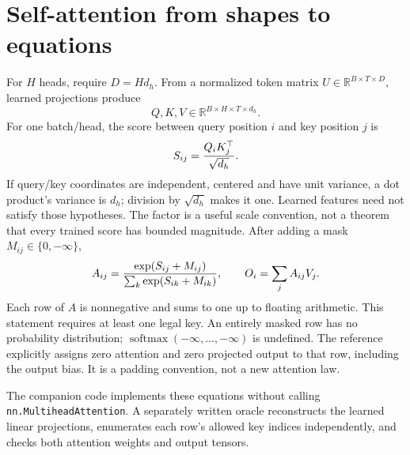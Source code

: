 \section{Self-attention from shapes to equations}

For $H$ heads, require $D=Hd_h$. From a normalized token matrix
$U\in\mathbb R^{B\times T\times D}$, learned projections produce
\[
Q,K,V\in\mathbb R^{B\times H\times T\times d_h}.
\]
For one batch/head, the score between query position $i$ and key position $j$ is
\begin{equation}
S_{ij}={Q_iK_j^\top\over\sqrt{d_h}}.
\label{evod23:score}
\end{equation}
If query/key coordinates are independent, centered and have unit variance, a dot
product's variance is $d_h$; division by $\sqrt{d_h}$ makes it one. Learned features
need not satisfy those hypotheses. The factor is a useful scale convention, not
a theorem that every trained score has bounded magnitude.
After adding a mask $M_{ij}\in\{0,-\infty\}$,
\[
A_{ij}={\exp(S_{ij}+M_{ij})\over\sum_k\exp(S_{ik}+M_{ik})},
\qquad O_i=\sum_jA_{ij}V_j.
\]
Each row of $A$ is nonnegative and sums to one up to floating arithmetic.
This statement requires at least one legal key. An entirely masked row has no
probability distribution; $\operatorname{softmax}(-\infty,\ldots,-\infty)$
is undefined. The reference explicitly assigns zero attention and zero projected
output to that row, including the output bias. It is a padding convention, not a
new attention law.


The companion code implements these equations without calling
\texttt{nn.MultiheadAttention}. A separately written oracle reconstructs the learned
linear projections, enumerates each row's allowed key indices independently,
and checks both attention weights and output tensors.

